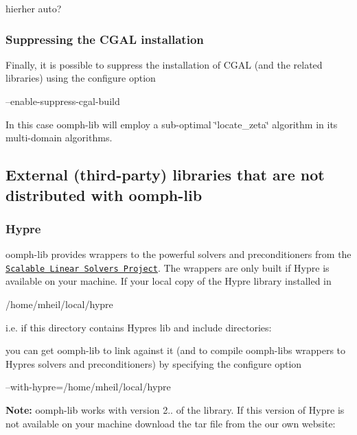 hierher auto?\hypertarget{index_cgal_no_install}{}\subsubsection{Suppressing the C\+G\+A\+L installation}\label{index_cgal_no_install}
Finally, it is possible to suppress the installation of C\+G\+AL (and the related libraries) using the configure option 
\begin{DoxyCode}
--enable-suppress-cgal-build
\end{DoxyCode}
 In this case {\ttfamily oomph-\/lib} will employ a sub-\/optimal \char`\"{}locate\+\_\+zeta\char`\"{} algorithm in its multi-\/domain algorithms.\hypertarget{index_external_dist}{}\subsection{External (third-\/party) libraries that are not distributed with oomph-\/lib}\label{index_external_dist}
\hypertarget{index_hypre}{}\subsubsection{Hypre}\label{index_hypre}
{\ttfamily oomph-\/lib} provides wrappers to the powerful solvers and preconditioners from the \href{https://computation.llnl.gov/casc/linear_solvers/sls_hypre.html}{\tt Scalable Linear Solvers Project}. The wrappers are only built if {\ttfamily Hypre} is available on your machine. If your local copy of the {\ttfamily Hypre} library installed in 
\begin{DoxyCode}
/home/mheil/local/hypre
\end{DoxyCode}
 i.\+e. if this directory contains {\ttfamily Hypre\textquotesingle{}s} lib and include directories\+: 
 you can get {\ttfamily oomph-\/lib} to link against it (and to compile {\ttfamily oomph-\/lib\textquotesingle{}s} wrappers to {\ttfamily Hypre\textquotesingle{}s} solvers and preconditioners) by specifying the configure option 
\begin{DoxyCode}
--with-hypre=/home/mheil/local/hypre
\end{DoxyCode}


{\bfseries Note\+:} {\ttfamily oomph-\/lib} works with version 2.. of the library. If this version of {\ttfamily Hypre} is not available on your machine download the tar file from the our own website\+:

